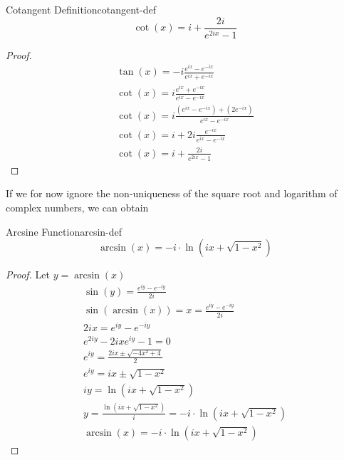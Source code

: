 \documentclass[a4paper]{article}
\begin{document}
\begin{mytheorem}{Cotangent Definition}{cotangent-def}
    \begin{equation}
        \cot(x) = i +  \frac{2i}{e^{2ix} -1}
    \end{equation}
    \begin{proof}
        \begin{gather*}
            \tan(x) = -i \frac{e^{ix} - e^{-ix}}{e^{ix} + e^{-ix}}
            \\
            \cot(x) = i \frac{e^{ix} + e^{-ix}}{e^{ix} - e^{-ix}}
            \\
            \cot(x) = i \frac{(e^{ix} - e^{-ix}) +( 2e^{-ix})}{e^{ix} - e^{-ix}}
            \\
            \cot(x) = i  + 2i \frac{e^{-ix}}{e^{ix} - e^{-ix}}
            \\
            \cot(x) = i  + \frac{2i}{e^{2ix} - 1}
        \end{gather*}
    \end{proof}
\end{mytheorem}

If we for now ignore the non-uniqueness of the square root and logarithm of complex numbers, we can obtain

\begin{mytheorem}{Arcsine Function}{arcsin-def}
    \begin{equation}
        \arcsin(x) = -i \cdot \ln( ix + \sqrt{1- x^2} )
    \end{equation}
    \begin{proof}
        Let $y = \arcsin(x)$
        \begin{gather*}
            \sin(y) = \frac{e^{iy} - e^{-iy}}{2i} \\
            \sin(\arcsin(x)) = x = \frac{e^{iy} - e^{-iy}}{2i} \\
            2i x = e^{iy} - e^{-iy} \\
            e^{2iy} - 2ix e^{iy} - 1 = 0 \\
            e^{iy} = \frac{2ix \pm \sqrt{-4x^2 + 4}}{2} \\
            e^{iy} = ix \pm \sqrt{1 -x^2} \\
            iy =  \ln( ix + \sqrt{1- x^2} ) \\
            y = \frac{\ln( ix + \sqrt{1- x^2})}{i} = -i \cdot \ln( ix + \sqrt{1- x^2}) \\
            \arcsin(x) = -i \cdot \ln( ix + \sqrt{1- x^2} )
        \end{gather*}
    \end{proof}
\end{mytheorem}
\end{document}
